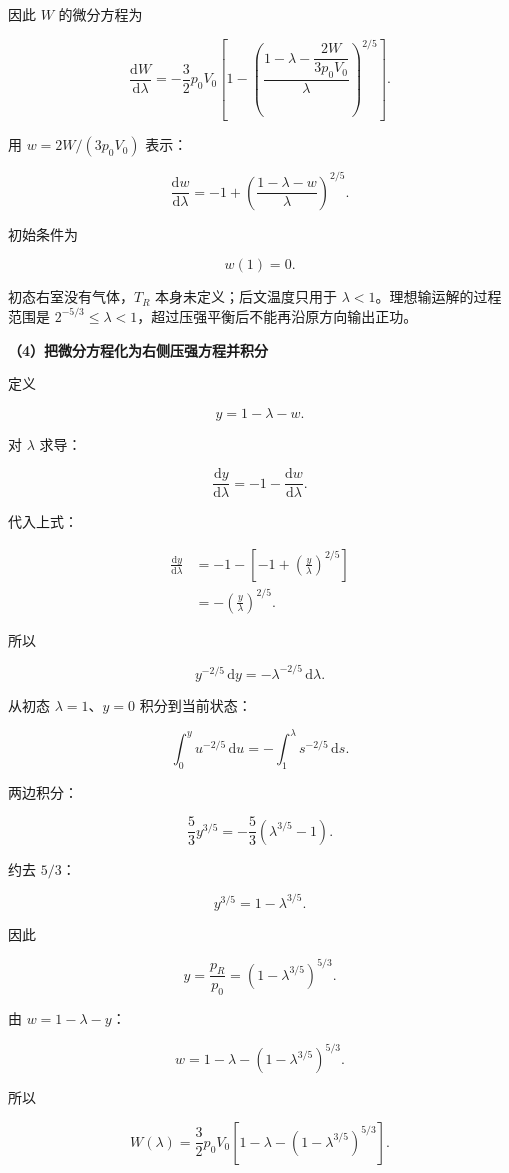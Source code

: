 \documentclass[12pt,a4paper,UTF8]{ctexart}
\begin{document}
因此 \(W\) 的微分方程为

\[
\boxed{
\frac{\mathrm{d}W}{\mathrm{d}\lambda}
=-\frac32p_0V_0
\left[
1-\left(
\frac{1-\lambda-\dfrac{2W}{3p_0V_0}}{\lambda}
\right)^{2/5}
\right]
}.
\]

用 \(w=2W/(3p_0V_0)\) 表示：

\[
\boxed{
\frac{\mathrm{d}w}{\mathrm{d}\lambda}
=-1+\left(\frac{1-\lambda-w}{\lambda}\right)^{2/5}
}.
\]

初始条件为

\[w(1)=0.\]

初态右室没有气体，\(T_R\) 本身未定义；后文温度只用于
\(\lambda<1\)。理想输运解的过程范围是
\(2^{-5/3}\le\lambda<1\)，超过压强平衡后不能再沿原方向输出正功。

\textbf{（4）把微分方程化为右侧压强方程并积分}

定义

\[y=1-\lambda-w.\]

对 \(\lambda\) 求导：

\[
\frac{\mathrm{d}y}{\mathrm{d}\lambda}
=-1-\frac{\mathrm{d}w}{\mathrm{d}\lambda}.
\]

代入上式：

\[
\begin{aligned}
\frac{\mathrm{d}y}{\mathrm{d}\lambda}
&=-1-\left[-1+\left(\frac y\lambda\right)^{2/5}\right]\\
&=-\left(\frac y\lambda\right)^{2/5}.
\end{aligned}
\]

所以

\[
y^{-2/5}\,\mathrm{d}y=-\lambda^{-2/5}\,\mathrm{d}\lambda.
\]

从初态 \(\lambda=1\)、\(y=0\) 积分到当前状态：

\[
\int_0^y u^{-2/5}\,\mathrm{d}u
=-\int_1^\lambda s^{-2/5}\,\mathrm{d}s.
\]

两边积分：

\[
\frac53y^{3/5}
=-\frac53(\lambda^{3/5}-1).
\]

约去 \(5/3\)：

\[
y^{3/5}=1-\lambda^{3/5}.
\]

因此

\[
\boxed{
y=\frac{p_R}{p_0}
=\left(1-\lambda^{3/5}\right)^{5/3}
}.
\]

由 \(w=1-\lambda-y\)：

\[
\boxed{
w=1-\lambda-\left(1-\lambda^{3/5}\right)^{5/3}
}.
\]

所以

\[
\boxed{
W(\lambda)=\frac32p_0V_0
\left[
1-\lambda-\left(1-\lambda^{3/5}\right)^{5/3}
\right]
}.
\]
\end{document}
